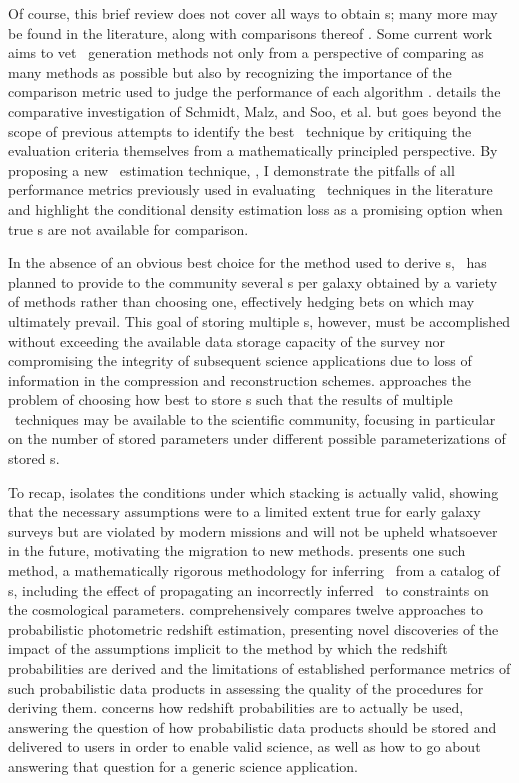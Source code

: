 Of course, this brief review does not cover all ways to obtain \pzpdf s; many more may be found in the literature, along with comparisons thereof \citep{Hildebrandt2010, Dahlen2013, Sanchez2013, bonnett_redshift_2016, tanaka_photometric_2018}.
Some current work aims to vet \pzpdf\ generation methods not only from a perspective of comparing as many methods as possible but also by recognizing the importance of the comparison metric used to judge the performance of each algorithm \citep{Wittman2016, polsterer_dealing_2016}.
 details the comparative investigation of Schmidt, Malz, and Soo, et al. 
but goes beyond the scope of previous attempts to identify the best \pzpdf\ technique by critiquing the evaluation criteria themselves from a mathematically principled perspective.
By proposing a new \pzpdf\ estimation technique, \trainz, I demonstrate the pitfalls of all performance metrics previously used in evaluating \pzpdf\ techniques in the literature and highlight the conditional density estimation loss as a promising option when true \pzpdf s are not available for comparison.

In the absence of an obvious best choice for the method used to derive \pzpdf s, \lsst\ has planned to provide to the community several \pzpdf s per galaxy obtained by a variety of methods rather than choosing one, effectively hedging bets on which may ultimately prevail.
This goal of storing multiple \pzpdf s, however, must be accomplished without exceeding the available data storage capacity of the survey nor compromising the integrity of subsequent science applications due to loss of information in the compression and reconstruction schemes.
 approaches the problem of choosing how best to store \pzpdf s such that the results of multiple \pzpdf\ techniques may be available to the scientific community, focusing in particular on the number of stored parameters under different possible parameterizations of stored \pzpdf s.

To recap,  isolates the conditions under which stacking is actually valid, showing that the necessary assumptions were to a limited extent true for early galaxy surveys but are violated by modern missions and will not be upheld whatsoever in the future, motivating the migration to new methods.
 presents one such method, a mathematically rigorous methodology for inferring \Nz\ from a catalog of \pzpdf s, including the effect of propagating an incorrectly inferred \Nz\ to constraints on the cosmological parameters.
 comprehensively compares twelve approaches to probabilistic photometric redshift estimation, presenting novel discoveries of the impact of the assumptions implicit to the method by which the redshift probabilities are derived and the limitations of established performance metrics of such probabilistic data products in assessing the quality of the procedures for deriving them.
 concerns how redshift probabilities are to actually be used, answering the question of how probabilistic data products should be stored and delivered to users in order to enable valid science, as well as how to go about answering that question for a generic science application.

